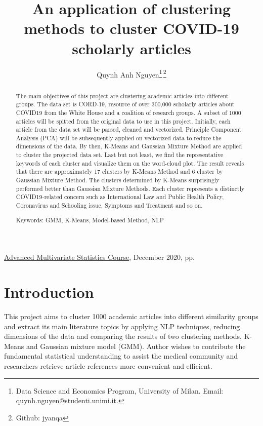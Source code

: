\documentclass[12pt]{article}
\title{An application of clustering methods to cluster COVID-19 scholarly articles 
}
\author{
Quynh Anh Nguyen\thanks{Data Science and Economics Program, University of Milan. Email: quynh.nguyen@studenti.unimi.it.}\;\,\thanks{Github: jyanqa}
}
\date{} %
\newcommand{\jref}{Advanced Multivariate Statistics}
\newcommand{\jhead}{Advanced Multivariate Statistics Course}
\newcommand{\jdate}{December 2020}
\begin{document}

\begin{htmlonly}
\href{\jref}{\jhead}, \jdate, pp.\
\end{htmlonly}

\maketitle
\thispagestyle{firstpage}

\begin{abstract}

The main objectives of this project are clustering academic articles into different groups. The data set is CORD-19, resource of over 300,000 scholarly articles about COVID19 from the White House and a coalition of research groups. A subset of 1000 articles will be spitted from the original data to use in this project. Initially, each article from the data set will be parsed, cleaned and vectorized. Principle Component Analysis (PCA) will be subsequently applied on vectorized data to reduce the dimensions of the data. By then, K-Means and Gaussian Mixture Method are applied to cluster the projected data set. Last but not least, we find the representative keywords of each cluster and visualize them on the word-cloud plot. The result reveals that there are approximately 17 clusters by K-Means Method and 6 cluster by Gaussian Mixture Method. The clusters determined by K-Means surprisingly performed better than Gaussian Mixture Methods. Each cluster represents a distinctly COVID19-related concern such as International Law and Public Health Policy, Coronavirus and Schooling issue, Symptoms and Treatment and so on. 

\smallskip
\noindent
Keywords: GMM, K-Means, Model-based Method, NLP
\end{abstract}


\setlength{\baselineskip}{16pt plus.2pt}

\section{Introduction}

 This project aims to cluster 1000 academic articles into different similarity groups and extract its main literature topics by applying NLP techniques, reducing dimensions of the data and comparing the results of two clustering methods, K-Means and Gaussian mixture model (GMM). Author wishes to contribute the fundamental statistical understanding to assist the medical community and researchers retrieve article references more convenient and efficient.
\end{document}

